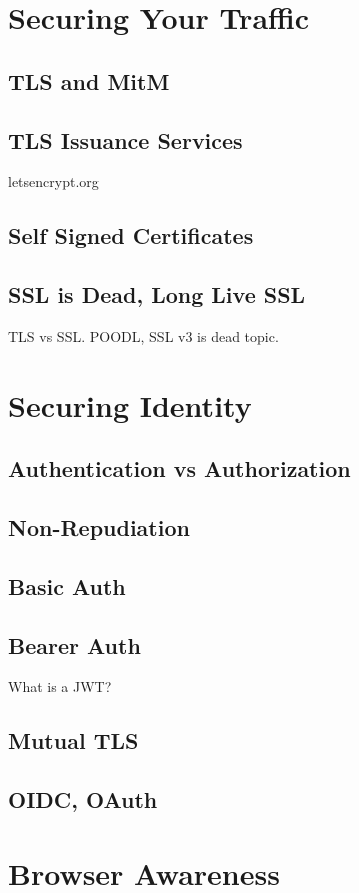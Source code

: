 \documentclass[12pt,oneside]{book} %
\begin{document}
\chapter{Securing Your Traffic}
\section{TLS and MitM}
\section{TLS Issuance Services}
letsencrypt.org
\section{Self Signed Certificates}
\section{SSL is Dead, Long Live SSL}
TLS vs SSL.  POODL, SSL v3 is dead topic.

\chapter{Securing Identity}
\section{Authentication vs Authorization}
\section{Non-Repudiation}
\section{Basic Auth}
\section{Bearer Auth}
What is a JWT?
\section{Mutual TLS}
\section{OIDC, OAuth}

\chapter{Browser Awareness}
\end{document}
